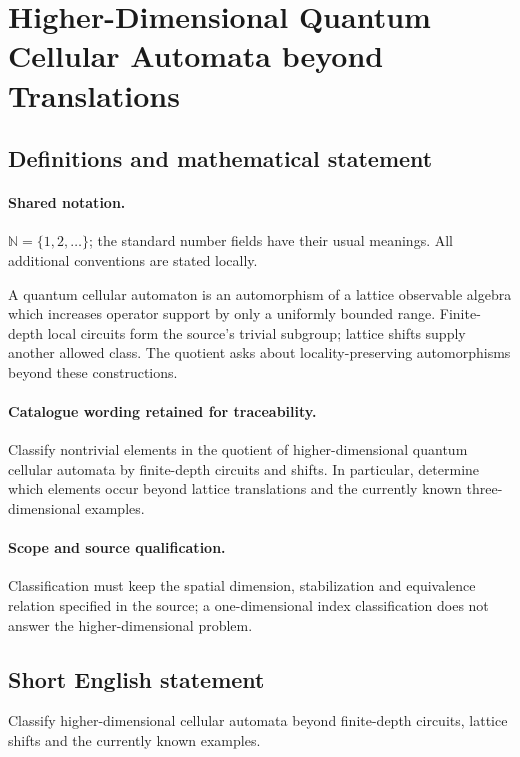 \documentclass[11pt]{article}
\begin{document}
\section{Higher-Dimensional Quantum Cellular Automata beyond Translations}\label{statement}

\subsection{Definitions and mathematical statement}

\paragraph{Shared notation.}$\mathbb N=\{1,2,\ldots\}$; the standard number fields have their usual meanings. All additional conventions are stated locally.


A quantum cellular automaton is an automorphism of a lattice observable algebra which increases operator support by only a uniformly bounded range. Finite-depth local circuits form the source's trivial subgroup; lattice shifts supply another allowed class. The quotient asks about locality-preserving automorphisms beyond these constructions.

\paragraph{Catalogue wording retained for traceability.}
Classify nontrivial elements in the quotient of higher-dimensional quantum cellular automata by finite-depth circuits and shifts. In particular, determine which elements occur beyond lattice translations and the currently known three-dimensional examples.

\paragraph{Scope and source qualification.}Classification must keep the spatial dimension, stabilization and equivalence relation specified in the source; a one-dimensional index classification does not answer the higher-dimensional problem.
\subsection{Short English statement}
Classify higher-dimensional cellular automata beyond finite-depth circuits, lattice shifts and the currently known examples.
\end{document}
